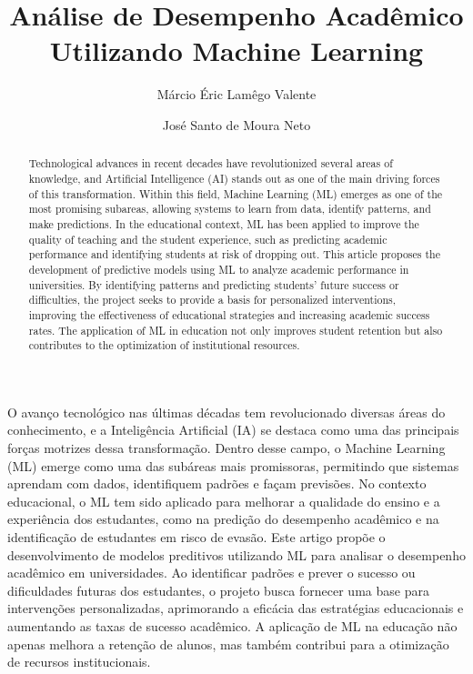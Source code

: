 \documentclass[12pt]{article}
\title{Análise de Desempenho Acadêmico Utilizando Machine Learning}
\author{Márcio Éric Lamêgo Valente\inst{1} \and José Santo de Moura Neto\inst{2}}
\begin{document}
\maketitle

\begin{abstract}
Technological advances in recent decades have revolutionized several areas of knowledge, and Artificial Intelligence (AI) stands out as one of the main driving forces of this transformation. Within this field, Machine Learning (ML) emerges as one of the most promising subareas, allowing systems to learn from data, identify patterns, and make predictions. In the educational context, ML has been applied to improve the quality of teaching and the student experience, such as predicting academic performance and identifying students at risk of dropping out. This article proposes the development of predictive models using ML to analyze academic performance in universities. By identifying patterns and predicting students' future success or difficulties, the project seeks to provide a basis for personalized interventions, improving the effectiveness of educational strategies and increasing academic success rates. The application of ML in education not only improves student retention but also contributes to the optimization of institutional resources.
\end{abstract}

\begin{resumo}
O avanço tecnológico nas últimas décadas tem revolucionado diversas áreas do conhecimento, e a Inteligência Artificial (IA) se destaca como uma das principais forças motrizes dessa transformação. Dentro desse campo, o Machine Learning (ML) emerge como uma das subáreas mais promissoras, permitindo que sistemas aprendam com dados, identifiquem padrões e façam previsões. No contexto educacional, o ML tem sido aplicado para melhorar a qualidade do ensino e a experiência dos estudantes, como na predição do desempenho acadêmico e na identificação de estudantes em risco de evasão. Este artigo propõe o desenvolvimento de modelos preditivos utilizando ML para analisar o desempenho acadêmico em universidades. Ao identificar padrões e prever o sucesso ou dificuldades futuras dos estudantes, o projeto busca fornecer uma base para intervenções personalizadas, aprimorando a eficácia das estratégias educacionais e aumentando as taxas de sucesso acadêmico. A aplicação de ML na educação não apenas melhora a retenção de alunos, mas também contribui para a otimização de recursos institucionais.
\end{resumo}
\end{document}
